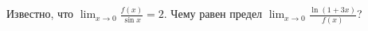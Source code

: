 \documentclass{article}
\begin{document}
Известно, что $\lim_{x \to 0} \frac{f(x)}{\sin x} = 2$. Чему равен предел $\lim_{x \to 0} \frac{\ln (1+3x)}{f(x)}$?
\end{document}
